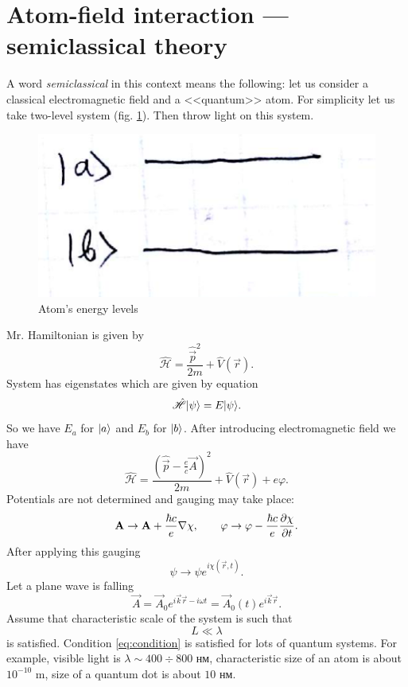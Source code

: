 \section{Atom-field interaction --- semiclassical theory}
\label{sec:atom-field_interaction}

A word \textit{semiclassical} in this context means the following: let us consider a classical electromagnetic field and a <<quantum>> atom. For simplicity let us take two-level system (fig. \ref{fig:2lvl}). Then throw light on this system.
\begin{figure}[h!]
	\centering
	\includegraphics[width=0.35\linewidth]{fig/L4/2lvl}
	\caption{Atom's energy levels }
	\label{fig:2lvl}
\end{figure}

Mr. Hamiltonian is given by
\begin{equation}
	\hat{\mathscr{H}} = \frac{\hat{\vec{p}}^2}{2 m} + \hat{V} (\vec{r}).
\end{equation}
System has eigenstates which are given by equation
\begin{equation}
	\hat{\mathscr{H}} \lvert\psi\rangle = E \lvert\psi\rangle.
\end{equation}
So we have $E_a$ for $\lvert a\rangle$ and $E_b$ for $\lvert b\rangle$. After introducing electromagnetic field we have
\begin{equation}
	\hat{\mathscr{H}} = \frac{(\hat{\vec{p}} - \frac{e}{c} \vec{A})^2}{2m} + \hat{V}(\vec{r}) + e \varphi.
\end{equation}
Potentials are not determined and gauging may take place:
\begin{equation}
	\mathbf{A} \to \mathbf{A} + \frac{\hbar c}{e} \nabla \chi, \qquad \varphi \to \varphi - \frac{\hbar c}{e} \dfrac{\partial {\chi}}{\partial {t}}.
\end{equation}
After applying this gauging 
\begin{equation}
	\psi \to \psi e^{i \chi(\vec{r},t)}.
\end{equation}
Let a plane wave is falling 
\begin{equation}
	\vec{A} = \vec{A}_0 e^{i \vec{k}\vec{r} - i \omega t} = \vec{A}_0(t) e^{i \vec{k}\vec{r}}.
\end{equation}
Assume that characteristic scale of the system is such that 
\begin{equation}
	L \ll \lambda
	\label{eq:condition}
\end{equation}
is satisfied. Condition \eqref{eq:condition} is satisfied for lots of quantum systems. 
For example, visible light is $\lambda \sim 400 \div 800 \text{ нм}$, 
characteristic size of an atom is about $10^{-10} \text{ m}$, size of a quantum dot is about $10 \text{ нм}$. 

